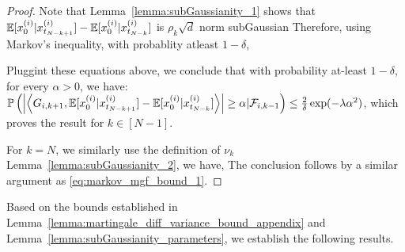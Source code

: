 \begin{proof}
{}
Note that Lemma~\ref{lemma:subGaussianity_1} shows that $\mathbb{E}[x_0^{(i)}|x_{t_{N-k+1}}^{(i)}]-\mathbb{E}[x_0^{(i)}|x_{t_{N-k}}^{(i)}]$ is $\rho_k\sqrt{d}$ norm subGaussian
Therefore, using Markov's inequality, with probablity atleast $1-\delta$, 

Pluggint these equations above, we conclude that with probability at-least $1-\delta$, for every $\alpha > 0$, we have:
$\mathbb{P}\left(\left|\left\langle G_{i,k+1}, \mathbb{E}[x_0^{(i)}|x_{t_{N-k+1}}^{(i)}]-\mathbb{E}[x_0^{(i)}|x_{t_{N-k}}^{(i)}]\right\rangle\right| \geq \alpha|\mathcal{F}_{i, k-1}\right) \leq \frac{2}{\delta}\exp(-\lambda \alpha^2)$, which proves the result for $k \in [N-1]$.


For $k = N$, we similarly use the definition of $\nu_k$ Lemma~\ref{lemma:subGaussianity_2}, 
we have, 
The conclusion follows by a similar argument as \eqref{eq:markov_mgf_bound_1}.
\end{proof}


Based on the bounds established in Lemma~\ref{lemma:martingale_diff_variance_bound_appendix} and Lemma~\ref{lemma:subGaussianity_parameters}, we establish the following results. 

